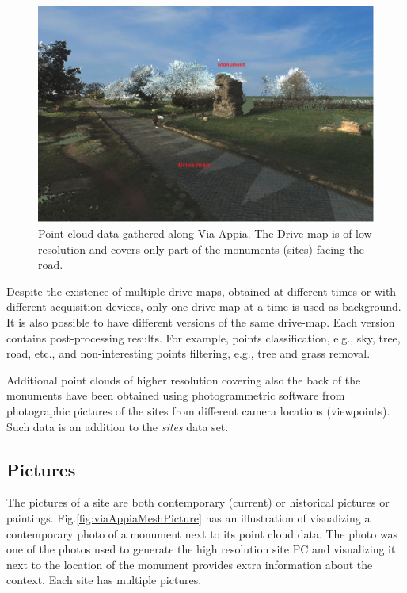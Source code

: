 \begin{figure}[!ht] \centering
\includegraphics[scale=0.5]{fig/conceptual_description/ViaAppiaPCAnnot.pdf}
\caption{Point cloud data gathered along Via Appia. The Drive map is of low
resolution and covers only part of the monuments (sites) facing the road.}
\label{fig:viaAppiaPointCloud} \end{figure}

Despite the existence of multiple drive-maps, obtained at different times or
with different acquisition devices, only one drive-map at a time is used as
background. It is also possible to have different versions of the same drive-map.
Each version contains post-processing results. For example, points classification,
e.g., sky, tree, road, etc., and non-interesting points filtering, e.g., tree and
grass removal.

Additional point clouds of higher resolution covering also the back of the
monuments have been obtained using photogrammetric software from photographic
pictures of the sites from different camera locations (viewpoints). Such data
is an addition to the {\em sites} data set.

\subsection{Pictures}
The pictures of a site are both contemporary (current) or historical pictures
or paintings. Fig.\ref{fig:viaAppiaMeshPicture} has an illustration of visualizing
a contemporary photo of a monument next to its point cloud data. The photo was
one of the photos used to generate the high resolution site PC and visualizing
it next to the location of the monument provides extra information about the
context. Each site has multiple pictures.

